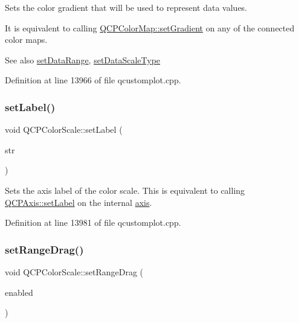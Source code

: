 Sets the color gradient that will be used to represent data values.

It is equivalent to calling \hyperlink{class_q_c_p_color_map_a7313c78360471cead3576341a2c50377}{Q\+C\+P\+Color\+Map\+::set\+Gradient} on any of the connected color maps.

\begin{DoxySeeAlso}{See also}
\hyperlink{class_q_c_p_color_scale_abe88633003a26d1e756aa74984587fef}{set\+Data\+Range}, \hyperlink{class_q_c_p_color_scale_aeb6107d67dd7325145b2498abae67fc3}{set\+Data\+Scale\+Type} 
\end{DoxySeeAlso}


Definition at line 13966 of file qcustomplot.\+cpp.

\mbox{\label{class_q_c_p_color_scale_aee124ae8396320cacf8276e9a0fbb8ce}} 
\subsubsection{\texorpdfstring{set\+Label()}{setLabel()}}
{\footnotesize\ttfamily void Q\+C\+P\+Color\+Scale\+::set\+Label (\begin{DoxyParamCaption}\item[{const Q\+String \&}]{str }\end{DoxyParamCaption})}

Sets the axis label of the color scale. This is equivalent to calling \hyperlink{class_q_c_p_axis_a33bcc382c111c9f31bb0687352a2dea4}{Q\+C\+P\+Axis\+::set\+Label} on the internal \hyperlink{class_q_c_p_color_scale_a39bdbdb3b212602a5a57f9f3ea444190}{axis}. 

Definition at line 13981 of file qcustomplot.\+cpp.

\mbox{\label{class_q_c_p_color_scale_a21c51a55e4fd581b6feadca9ee5b38d5}} 
\subsubsection{\texorpdfstring{set\+Range\+Drag()}{setRangeDrag()}}
{\footnotesize\ttfamily void Q\+C\+P\+Color\+Scale\+::set\+Range\+Drag (\begin{DoxyParamCaption}\item[{bool}]{enabled }\end{DoxyParamCaption})}

